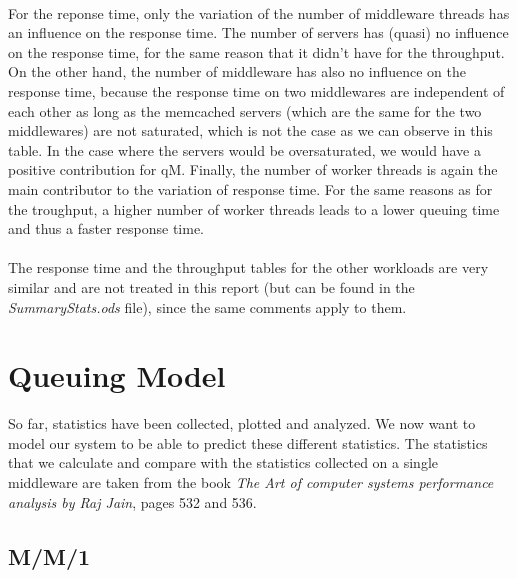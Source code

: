 \documentclass[11pt,a4paper]{article}
\begin{document}
\\
For the reponse time, only the variation of the number of middleware threads has an influence on the response time. The number of servers has (quasi) no influence on the response time, for the same reason that it didn't have for the throughput. On the other hand, the number of middleware has also no influence on the response time, because the response time on two middlewares are independent of each other as long as the memcached servers (which are the same for the two middlewares) are not saturated, which is not the case as we can observe in this table. In the case where the servers would be oversaturated, we would have a positive contribution for qM. 
Finally, the number of worker threads is again the main contributor to the variation of response time. For the same reasons as for the troughput, a higher number of worker threads leads to a lower queuing time and thus a faster response time. 
\\\\
The response time and the throughput tables for the other workloads are very similar and are not treated in this report (but can be found in the \textit{SummaryStats.ods} file), since the same comments apply to them. 
\newpage
\section{Queuing Model}
So far, statistics have been collected, plotted and analyzed. We now want to model our system to be able to predict these different statistics. The statistics that we calculate and compare with the statistics collected on a single middleware are taken from the book \textit{The Art of computer systems performance analysis by Raj Jain}, pages 532 and 536. 

\subsection{M/M/1}
\end{document}
